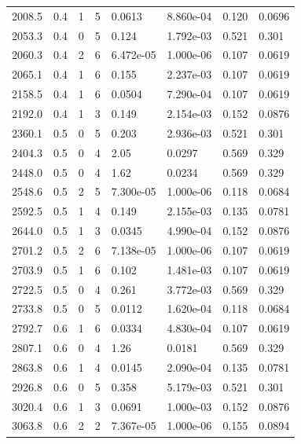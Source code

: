 \documentclass[preview]{standalone}
\begin{document}
{{{\begin{tabular}{L{1.2cm}C{1.2cm} C{0.3cm}C{0.5cm} C{1.4cm}C{1.4cm} C{1.4cm}C{1.4cm}}
  2008.5  &   0.4  & 1     &  5 &  0.0613  & 8.860e-04  & 0.120 &  0.0696   \\ 
  2053.3  &   0.4  & 0     &  5 &  0.124  & 1.792e-03  & 0.521 &  0.301   \\ 
  2060.3  &   0.4  & 2     &  6 &  6.472e-05  & 1.000e-06  & 0.107 &  0.0619   \\ 
  2065.1  &   0.4  & 1     &  6 &  0.155  & 2.237e-03  & 0.107 &  0.0619   \\ 
  2158.5  &   0.4  & 1     &  6 &  0.0504  & 7.290e-04  & 0.107 &  0.0619   \\ 
  2192.0  &   0.4  & 1     &  3 &  0.149  & 2.154e-03  & 0.152 &  0.0876   \\ 
  2360.1  &   0.5  & 0     &  5 &  0.203  & 2.936e-03  & 0.521 &  0.301   \\ 
  2404.3  &   0.5  & 0     &  4 &  2.05  & 0.0297  & 0.569 &  0.329   \\ 
  2448.0  &   0.5  & 0     &  4 &  1.62  & 0.0234  & 0.569 &  0.329   \\ 
  2548.6  &   0.5  & 2     &  5 &  7.300e-05  & 1.000e-06  & 0.118 &  0.0684   \\ 
  2592.5  &   0.5  & 1     &  4 &  0.149  & 2.155e-03  & 0.135 &  0.0781   \\ 
  2644.0  &   0.5  & 1     &  3 &  0.0345  & 4.990e-04  & 0.152 &  0.0876   \\ 
  2701.2  &   0.5  & 2     &  6 &  7.138e-05  & 1.000e-06  & 0.107 &  0.0619   \\ 
  2703.9  &   0.5  & 1     &  6 &  0.102  & 1.481e-03  & 0.107 &  0.0619   \\ 
  2722.5  &   0.5  & 0     &  4 &  0.261  & 3.772e-03  & 0.569 &  0.329   \\ 
  2733.8  &   0.5  & 0     &  5 &  0.0112  & 1.620e-04  & 0.118 &  0.0684   \\ 
  2792.7  &   0.6  & 1     &  6 &  0.0334  & 4.830e-04  & 0.107 &  0.0619   \\ 
  2807.1  &   0.6  & 0     &  4 &  1.26  & 0.0181  & 0.569 &  0.329   \\ 
  2863.8  &   0.6  & 1     &  4 &  0.0145  & 2.090e-04  & 0.135 &  0.0781   \\ 
  2926.8  &   0.6  & 0     &  5 &  0.358  & 5.179e-03  & 0.521 &  0.301   \\ 
  3020.4  &   0.6  & 1     &  3 &  0.0691  & 1.000e-03  & 0.152 &  0.0876   \\ 
  3063.8  &   0.6  & 2     &  2 &  7.367e-05  & 1.000e-06  & 0.155 &  0.0894   \\ 

\end{tabular}}}}
\end{document}
